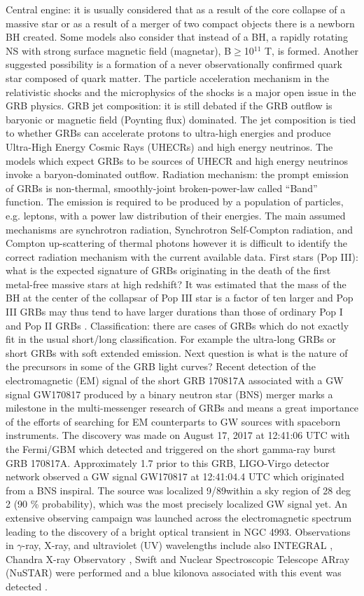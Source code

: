 \documentclass[12pt, a4paper,titlepage]{article}
\numberwithin{equation}{section}
\numberwithin{figure}{section}
\begin{document}
Central engine: it is usually considered that as a result of the core collapse of a massive star or as a result of a merger of two compact objects there is a newborn BH created. Some models also consider that instead of a BH, a rapidly rotating NS with strong surface magnetic field (magnetar), B$\geqslant	$10$^{11}$ T, is formed. Another suggested possibility is a formation of a never observationally confirmed quark star composed of quark matter.
The particle acceleration mechanism in the relativistic shocks and the microphysics of the shocks is a major open issue in the GRB physics. 
GRB jet composition: it is still debated if the GRB outflow is baryonic or magnetic field (Poynting flux) dominated. The jet composition is tied to whether GRBs can accelerate protons to ultra-high energies and produce Ultra-High Energy Cosmic Rays (UHECRs) and high energy neutrinos. The models which expect GRBs to be sources of UHECR and high energy neutrinos invoke a baryon-dominated outflow.
Radiation mechanism: the prompt emission of GRBs is non-thermal, smoothly-joint broken-power-law called “Band” function. The emission is required to be produced by a population of particles, e.g. leptons, with a power law distribution of their energies. The main assumed mechanisms are synchrotron radiation, Synchrotron Self-Compton radiation, and Compton up-scattering of thermal photons however it is difficult to identify the correct radiation mechanism with the current available
data.
First stars (Pop III): what is the expected signature of GRBs originating in the death of the first metal-free massive stars at high redshift? It was estimated that the mass of the BH at the center of the collapsar of Pop III star is a factor of ten larger and Pop III GRBs may thus tend to have larger durations than those of ordinary Pop I and Pop II GRBs \cite{grb20}.
Classification: there are cases of GRBs which do not exactly fit in the usual short/long classification.
For example the ultra-long GRBs or short GRBs with soft extended emission. Next question is what is
the nature of the precursors in some of the GRB light curves?
Recent detection of the electromagnetic (EM) signal of the short GRB 170817A \cite{grb21} associated with a GW signal GW170817 produced by a binary neutron star (BNS) merger \cite{grb17} marks a milestone in the multi-messenger research of GRBs and means a great importance of the efforts of searching for EM counterparts to GW sources with spaceborn instruments. The discovery was made on August 17, 2017 at 12:41:06 UTC with the Fermi/GBM which detected and triggered on the short gamma-ray burst GRB 170817A. Approximately 1.7 prior to this GRB, LIGO-Virgo detector network observed a GW signal GW170817 at 12:41:04.4 UTC which originated from a BNS inspiral. The source was localized 9/89within a sky region of 28 deg 2 (90 \% probability), which was the most precisely localized GW signal yet. An extensive observing campaign was launched across the electromagnetic spectrum leading to the discovery of a bright optical transient in NGC 4993. Observations in $\gamma$-ray, X-ray, and ultraviolet (UV) wavelengths include also INTEGRAL \cite{grb22}, Chandra X-ray Observatory \cite{grb23}, Swift and Nuclear Spectroscopic Telescope ARray (NuSTAR) were performed and a blue kilonova associated with this event was detected \cite{grb24}.
\end{document}
